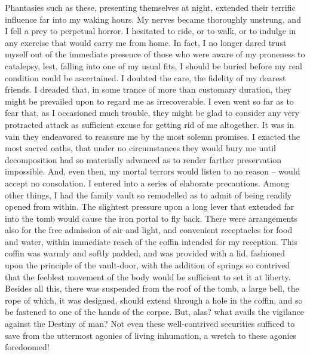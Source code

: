 \documentclass[12pt,a4paper]{article}
\begin{document}
Phantasies such as these, presenting themselves at night, extended their terrific influence far into my waking hours. My nerves became thoroughly unstrung, and I fell a prey to perpetual horror. I hesitated to ride, or to walk, or to indulge in any exercise that would carry me from home. In fact, I no longer dared trust myself out of the immediate presence of those who were aware of my proneness to catalepsy, lest, falling into one of my usual fits, I should be buried before my real condition could be ascertained. I doubted the care, the fidelity of my dearest friends. I dreaded that, in some trance of more than customary duration, they might be prevailed upon to regard me as irrecoverable. I even went so far as to fear that, as I occasioned much trouble, they might be glad to consider any very protracted attack as sufficient excuse for getting rid of me altogether. It was in vain they endeavored to reassure me by the most solemn promises. I exacted the most sacred oaths, that under no circumstances they would bury me until decomposition had so materially advanced as to render farther preservation impossible. And, even then, my mortal terrors would listen to no reason -- would accept no consolation. I entered into a series of elaborate precautions. Among other things, I had the family vault so remodelled as to admit of being readily opened from within. The slightest pressure upon a long lever that extended far into the tomb would cause the iron portal to fly back. There were arrangements also for the free admission of air and light, and convenient receptacles for food and water, within immediate reach of the coffin intended for my reception. This coffin was warmly and softly padded, and was provided with a lid, fashioned upon the principle of the vault-door, with the addition of springs so contrived that the feeblest movement of the body would be sufficient to set it at liberty. Besides all this, there was suspended from the roof of the tomb, a large bell, the rope of which, it was designed, should extend through a hole in the coffin, and so be fastened to one of the hands of the corpse. But, alas? what avails the vigilance against the Destiny of man? Not even these well-contrived securities sufficed to save from the uttermost agonies of living inhumation, a wretch to these agonies foredoomed! \\
\end{document}
